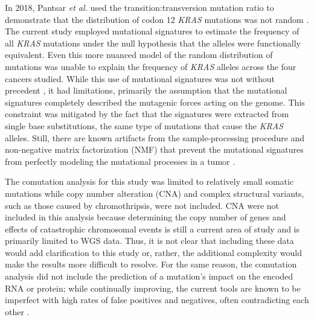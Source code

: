 \documentclass[english, 10pt, letterpaper]{article}
\newcommand{\KRAS}{\emph{KRAS}}
\begin{document}
In 2018, Pantsar \emph{et al.} used the transition:transversion mutation ratio to demonstrate that the distribution of codon 12 \KRAS{} mutations was not random \cite{Pantsar2018}.
The current study employed mutational signatures to estimate the frequency of all \KRAS{} mutations under the null hypothesis that the alleles were functionally equivalent.
Even this more nuanced model of the random distribution of mutations was unable to explain the frequency of \KRAS{} alleles across the four cancers studied.
While this use of mutational signatures was not without precedent \cite{Dietlein2020IdentificationContext., Bergstrom2020GeneratingSigProfilerSimulator}, it had limitations, primarily the assumption that the mutational signatures completely described the mutagenic forces acting on the genome.
This constraint was mitigated by the fact that the signatures were extracted from single base substitutions, the same type of mutations that cause the \KRAS{} alleles.
Still, there are known artifacts from the sample-processing procedure and non-negative matrix factorization (NMF) that prevent the mutational signatures from perfectly modeling the mutational processes in a tumor \cite{Alexandrov2015, Gawad2016, Alexandrov2020TheCancer.}.

The comutation analysis for this study was limited to relatively small somatic mutations while copy number alteration (CNA) and complex structural variants, such as those caused by chromothripsis, were not included.
CNA were not included in this analysis because determining the copy number of genes and effects of catastrophic chromosomal events is still a current area of study and is primarily limited to WGS data.
Thus, it is not clear that including these data would add clarification to this study or, rather, the additional complexity would make the results more difficult to resolve.
For the same reason, the comutation analysis did not include the prediction of a mutation's impact on the encoded RNA or protein; while continually improving, the current tools are known to be imperfect with high rates of false positives and negatives, often contradicting each other \cite{Dong2015ComparisonStudies., Chun2009IdentificationGenomes., Schwarz2010MutationTasterAlterations., Thusberg2011PerformanceVariants., Wei2011IncorporatingStudy., Flanagan2010UsingMutations.}.
\end{document}
